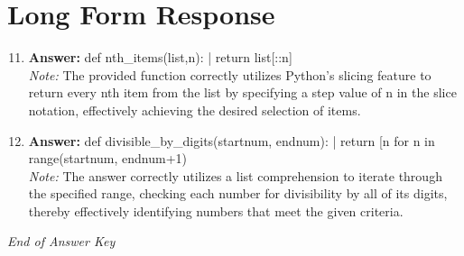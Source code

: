 \documentclass[12pt]{article}
\begin{document}
\section*{Long Form Response}
\begin{enumerate}[label=\arabic*.]
\setcounter{enumi}{10}
\item \textbf{Answer:} def nth\_items(list,n): | return list[::n]
\\ \textit{Note:} The provided function correctly utilizes Python's slicing feature to return every nth item from the list by specifying a step value of n in the slice notation, effectively achieving the desired selection of items.
\item \textbf{Answer:} def divisible\_by\_digits(startnum, endnum): | return [n for n in range(startnum, endnum+1) \
\\ \textit{Note:} The answer correctly utilizes a list comprehension to iterate through the specified range, checking each number for divisibility by all of its digits, thereby effectively identifying numbers that meet the given criteria.
\end{enumerate}

\vfill
\noindent\textit{End of Answer Key}
\end{document}
